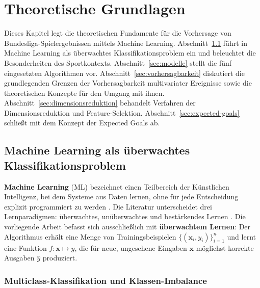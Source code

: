 
\chapter{Theoretische Grundlagen}\label{chap:grundlagen}

Dieses Kapitel legt die theoretischen Fundamente für die Vorhersage von
Bundesliga-Spielergebnissen mittels Machine Learning. Abschnitt~\ref{sec:ml-grundlagen}
führt in Machine Learning als überwachtes Klassifikationsproblem ein und
beleuchtet die Besonderheiten des Sportkontexts. Abschnitt~\ref{sec:modelle}
stellt die fünf eingesetzten Algorithmen vor. Abschnitt~\ref{sec:vorhersagbarkeit}
diskutiert die grundlegenden Grenzen der Vorhersagbarkeit multivariater
Ereignisse sowie die theoretischen Konzepte für den Umgang mit ihnen.
Abschnitt~\ref{sec:dimensionsreduktion} behandelt Verfahren der
Dimensionsreduktion und Feature-Selektion. Abschnitt~\ref{sec:expected-goals}
schließt mit dem Konzept der Expected Goals ab.

\section{Machine Learning als überwachtes Klassifikationsproblem}
\label{sec:ml-grundlagen}

\textbf{Machine Learning} (ML) bezeichnet einen Teilbereich der Künstlichen
Intelligenz, bei dem Systeme aus Daten lernen, ohne für jede Entscheidung
explizit programmiert zu werden \cite{JamesEtAl2021}. Die Literatur
unterscheidet drei Lernparadigmen: überwachtes, unüberwachtes und
bestärkendes Lernen \cite{JamesEtAl2021,BunkerThabtah2019}. Die vorliegende
Arbeit befasst sich ausschließlich mit \textbf{überwachtem Lernen}: Der
Algorithmus erhält eine Menge von Trainingsbeispielen $\{(\mathbf{x}_i,
y_i)\}_{i=1}^{n}$ und lernt eine Funktion $f: \mathbf{x} \mapsto y$,
die für neue, ungesehene Eingaben $\mathbf{x}$ möglichst korrekte
Ausgaben $\hat{y}$ produziert.

\subsection{Multiclass-Klassifikation und Klassen-Imbalance}

